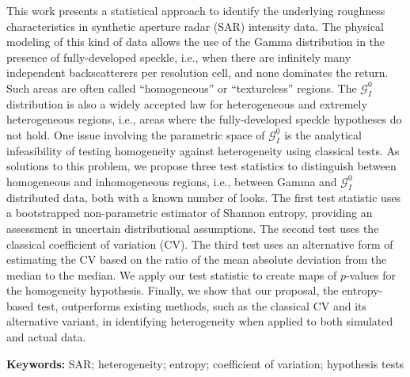 This work presents a statistical approach to identify the
underlying roughness characteristics in synthetic aperture radar (SAR)
intensity data. The physical modeling of this kind of data allows the
use of the Gamma distribution in the presence of fully-developed
speckle, i.e., when there are infinitely many independent backscatterers
per resolution cell, and none dominates the return. Such areas are often
called ``homogeneous'' or ``textureless'' regions. The
\(\mathcal{G}_I^0\) distribution is also a widely accepted law for
heterogeneous and extremely heterogeneous regions, i.e., areas where the
fully-developed speckle hypotheses do not hold.
One issue involving the parametric space of $\mathcal{G}_I^0$ is the analytical 
infeasibility of testing homogeneity against heterogeneity using classical tests. 
As solutions to this problem, we propose three test
statistics to distinguish between homogeneous and inhomogeneous regions,
i.e., between Gamma and \(\mathcal{G}_I^0\) distributed data, both with
a known number of looks. The first test statistic uses a bootstrapped
non-parametric estimator of Shannon entropy, providing an
assessment in uncertain distributional assumptions. The second test uses
the classical coefficient of variation (CV). The third test uses an
alternative form of estimating the CV based on the ratio of the mean
absolute deviation from the median to the median. We apply our test
statistic to create maps of \(p\)-values for the homogeneity hypothesis.
Finally, we show that our proposal, the entropy-based test, outperforms
existing methods, such as the classical CV and its alternative variant,
in identifying heterogeneity when applied to both simulated and actual
data.

\par
\noindent \textbf{Keywords:} SAR; heterogeneity; entropy; coefficient of variation; hypothesis tests



